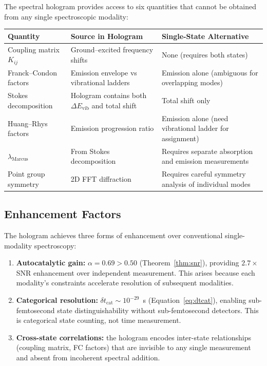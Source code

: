 \documentclass[11pt,twocolumn,a4paper]{article}
\theoremstyle{definition}
\theoremstyle{remark}
\begin{document}
The spectral hologram provides access to six quantities that cannot be obtained from any single spectroscopic modality:

\begin{center}
\begin{tabular}{p{4cm}p{5cm}p{4cm}}
\toprule
Quantity & Source in Hologram & Single-State Alternative \\
\midrule
Coupling matrix $K_{ij}$ & Ground--excited frequency shifts & None (requires both states) \\
Franck--Condon factors & Emission envelope vs vibrational ladders & Emission alone (ambiguous for overlapping modes) \\
Stokes decomposition & Hologram contains both $\Delta E_{\mathrm{vib}}$ and total shift & Total shift only \\
Huang--Rhys factors & Emission progression ratio & Emission alone (need vibrational ladder for assignment) \\
$\lambda_{\mathrm{Marcus}}$ & From Stokes decomposition & Requires separate absorption and emission measurements \\
Point group symmetry & 2D FFT diffraction & Requires careful symmetry analysis of individual modes \\
\bottomrule
\end{tabular}
\end{center}

\subsection{Enhancement Factors}

The hologram achieves three forms of enhancement over conventional single-modality spectroscopy:

\begin{enumerate}[label=(\roman*)]
  \item \textbf{Autocatalytic gain:} $\alpha = 0.69 > 0.50$ (Theorem~\ref{thm:snr}), providing $2.7\times$ SNR enhancement over independent measurement. This arises because each modality's constraints accelerate resolution of subsequent modalities.
  \item \textbf{Categorical resolution:} $\delta t_{\mathrm{cat}} \sim 10^{-29}$~s (Equation~\ref{eq:dtcat}), enabling sub-femtosecond state distinguishability without sub-femtosecond detectors. This is categorical state counting, not time measurement.
  \item \textbf{Cross-state correlations:} the hologram encodes inter-state relationships (coupling matrix, FC factors) that are invisible to any single measurement and absent from incoherent spectral addition.
\end{enumerate}
\end{document}
